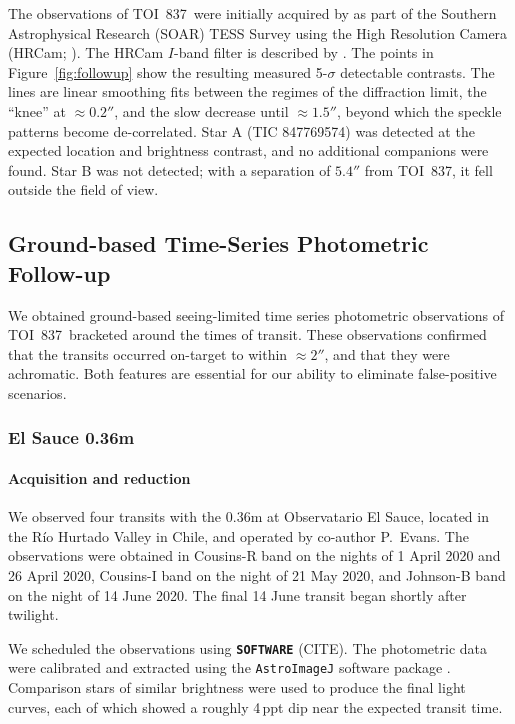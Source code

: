\documentclass[12pt,twocolumn,tighten]{aastex63}
\newcommand{\tn}{TOI~837} %
\begin{document}
The observations of \tn\ were initially acquired by
\citet{ziegler_soar_2020} as part of the Southern Astrophysical
Research (SOAR) TESS Survey using the High Resolution Camera (HRCam;
\citealt{tokovinin_ten_2018}).  The HRCam $I$-band filter is described
by \citet{tokovinin_ten_2018}.  The points in Figure~\ref{fig:followup}
show the resulting measured 5-$\sigma$ detectable contrasts.  The
lines are linear smoothing fits between the regimes of the diffraction
limit, the ``knee'' at $\approx 0.2''$, and the slow decrease until
$\approx 1.5''$, beyond which the speckle patterns become
de-correlated.  Star A (TIC 847769574) was detected at the expected
location and brightness contrast, and no additional companions were
found.  Star B was not detected; with a separation of $5.4''$ from
\tn, it fell outside the field of view.



\subsection{Ground-based Time-Series Photometric Follow-up}
\label{subsec:groundphot}

We obtained ground-based seeing-limited time series photometric
observations of \tn\ bracketed around the times of transit.  These
observations confirmed that the transits occurred on-target to within
$\approx 2''$, and that they were achromatic. Both features are
essential for our ability to eliminate false-positive scenarios.

\subsubsection{El Sauce 0.36m}

\paragraph{Acquisition and reduction}
We observed four transits with the 0.36m at Observatario El Sauce,
located in the R\'io Hurtado Valley in Chile, and operated by
co-author P{.}~Evans.  The observations were obtained in Cousins-R
band on the nights of 1 April 2020 and 26 April 2020, Cousins-I band
on the night of 21 May 2020, and Johnson-B band on the night of 14
June 2020.  The final 14 June transit began shortly after twilight.

We scheduled the observations using {\bf \texttt{SOFTWARE}} (CITE).
The photometric data were calibrated and extracted using the
\texttt{AstroImageJ} software package
\citep{collins_astroimagej_2017}.  Comparison stars of similar
brightness were used to produce the final light curves, each of which
showed a roughly 4$\,$ppt dip near the expected transit time.
\end{document}
